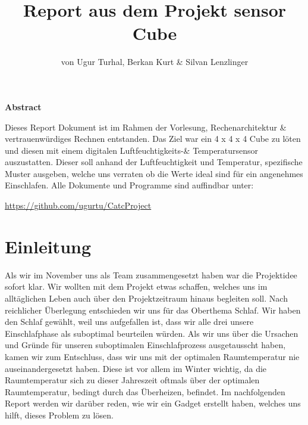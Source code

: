 \documentclass{article}
\title{Report aus dem Projekt sensor Cube}
\author{von Ugur Turhal, Berkan Kurt \& Silvan Lenzlinger}
\begin{document}
\maketitle
\tableofcontents
\newpage
\begin{center}
\textbf{Abstract}
\end{center}
Dieses Report Dokument ist im Rahmen der Vorlesung, Rechenarchitektur \& vertrauenwürdiges Rechnen entstanden. Das Ziel war ein 4 x 4 x 4  Cube zu löten und diesen mit einem digitalen Luftfeuchtigkeits-\& Temperatursensor auszustatten.
Dieser soll anhand der Luftfeuchtigkeit und Temperatur, spezifische Muster ausgeben, welche uns verraten ob die Werte ideal sind für ein angenehmes Einschlafen. Alle Dokumente und Programme sind auffindbar unter: \begin{center}
\faGithub \text { }  \url{https://github.com/ugurtu/CatcProject}
\end{center}

\section{Einleitung}
Als wir im November uns als Team zusammengesetzt haben war die Projektidee sofort klar. Wir wollten mit dem Projekt etwas schaffen, welches uns im alltäglichen Leben auch über den Projektzeitraum hinaus begleiten soll.
Nach reichlicher Überlegung entschieden wir uns für das Oberthema Schlaf. Wir haben den Schlaf gewählt, weil uns aufgefallen ist, dass wir alle drei unsere Einschlafphase als suboptimal beurteilen würden. Als wir uns über die Ursachen und Gründe für unseren suboptimalen Einschlafprozess ausgetausscht haben, kamen wir zum Entschluss, dass wir uns mit der optimalen Raumtemperatur nie auseinandergesetzt haben. Diese ist vor allem im Winter wichtig, da die Raumtemperatur sich zu dieser Jahreszeit oftmals über der optimalen Raumtemperatur, bedingt durch das Überheizen, befindet. Im nachfolgenden Report werden wir darüber reden, wie wir ein Gadget erstellt haben, welches uns hilft, dieses Problem zu lösen.
\end{document}
